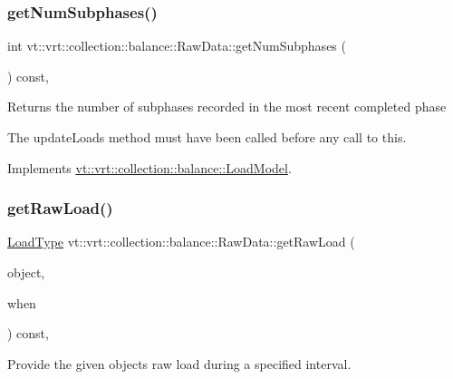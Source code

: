 \subsubsection{\texorpdfstring{get\+Num\+Subphases()}{getNumSubphases()}}
{\footnotesize\ttfamily int vt\+::vrt\+::collection\+::balance\+::\+Raw\+Data\+::get\+Num\+Subphases (\begin{DoxyParamCaption}{ }\end{DoxyParamCaption}) const\hspace{0.3cm}{\ttfamily [override]}, {\ttfamily [virtual]}}

Returns the number of subphases recorded in the most recent completed phase

The {\ttfamily update\+Loads} method must have been called before any call to this. 

Implements \hyperlink{structvt_1_1vrt_1_1collection_1_1balance_1_1_load_model_aa7ddeca4fc8de99bc25a895e207de2e6}{vt\+::vrt\+::collection\+::balance\+::\+Load\+Model}.

\mbox{\label{structvt_1_1vrt_1_1collection_1_1balance_1_1_raw_data_ab676b33ed75ac294a0243f912d0b6309}} 
\subsubsection{\texorpdfstring{get\+Raw\+Load()}{getRawLoad()}}
{\footnotesize\ttfamily \hyperlink{namespacevt_a8fb51741340b87d7aaee0bef60e9896b}{Load\+Type} vt\+::vrt\+::collection\+::balance\+::\+Raw\+Data\+::get\+Raw\+Load (\begin{DoxyParamCaption}\item[{\hyperlink{namespacevt_1_1vrt_1_1collection_1_1balance_a9f5b53fafb270212279a4757d2c4cd28}{Element\+I\+D\+Struct}}]{object,  }\item[{\hyperlink{structvt_1_1vrt_1_1collection_1_1balance_1_1_phase_offset}{Phase\+Offset}}]{when }\end{DoxyParamCaption}) const\hspace{0.3cm}{\ttfamily [override]}, {\ttfamily [virtual]}}



Provide the given object\textquotesingle{}s raw load during a specified interval. 



